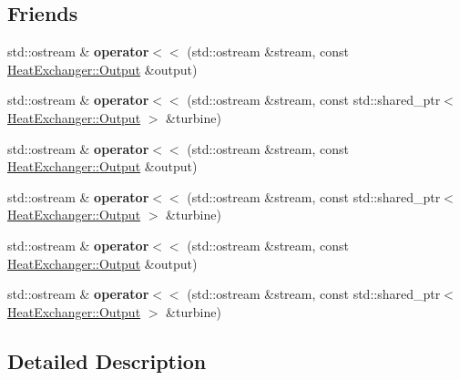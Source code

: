 \subsection*{Friends}
\begin{DoxyCompactItemize}
\item 
\mbox{\label{class_heat_exchanger_adf0092e6be7387845fcedbd11059cb59}} 
std\+::ostream \& {\bfseries operator$<$$<$} (std\+::ostream \&stream, const \hyperlink{struct_heat_exchanger_1_1_output}{Heat\+Exchanger\+::\+Output} \&output)
\item 
\mbox{\label{class_heat_exchanger_a5b777070a9f9bfb82e79c49bd6dc1975}} 
std\+::ostream \& {\bfseries operator$<$$<$} (std\+::ostream \&stream, const std\+::shared\+\_\+ptr$<$ \hyperlink{struct_heat_exchanger_1_1_output}{Heat\+Exchanger\+::\+Output} $>$ \&turbine)
\item 
\mbox{\label{class_heat_exchanger_adf0092e6be7387845fcedbd11059cb59}} 
std\+::ostream \& {\bfseries operator$<$$<$} (std\+::ostream \&stream, const \hyperlink{struct_heat_exchanger_1_1_output}{Heat\+Exchanger\+::\+Output} \&output)
\item 
\mbox{\label{class_heat_exchanger_a5b777070a9f9bfb82e79c49bd6dc1975}} 
std\+::ostream \& {\bfseries operator$<$$<$} (std\+::ostream \&stream, const std\+::shared\+\_\+ptr$<$ \hyperlink{struct_heat_exchanger_1_1_output}{Heat\+Exchanger\+::\+Output} $>$ \&turbine)
\item 
\mbox{\label{class_heat_exchanger_adf0092e6be7387845fcedbd11059cb59}} 
std\+::ostream \& {\bfseries operator$<$$<$} (std\+::ostream \&stream, const \hyperlink{struct_heat_exchanger_1_1_output}{Heat\+Exchanger\+::\+Output} \&output)
\item 
\mbox{\label{class_heat_exchanger_a5b777070a9f9bfb82e79c49bd6dc1975}} 
std\+::ostream \& {\bfseries operator$<$$<$} (std\+::ostream \&stream, const std\+::shared\+\_\+ptr$<$ \hyperlink{struct_heat_exchanger_1_1_output}{Heat\+Exchanger\+::\+Output} $>$ \&turbine)
\end{DoxyCompactItemize}


\subsection{Detailed Description}


